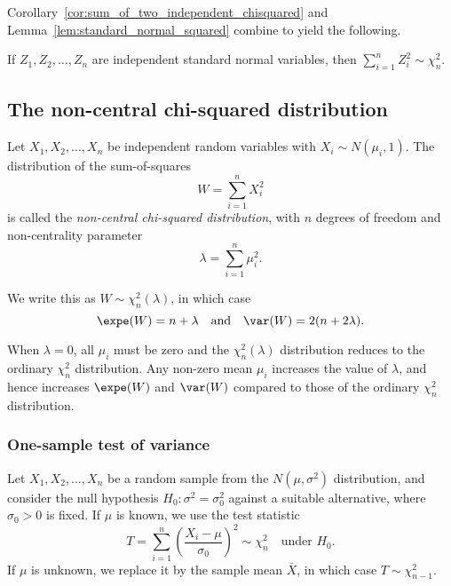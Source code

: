 Corollary~\ref{cor:sum_of_two_independent_chisquared} and Lemma~\ref{lem:standard_normal_squared} combine to yield the following.
\begin{corollary}
If $Z_1,Z_2,\ldots,Z_n$ are independent standard normal variables, then $\displaystyle\sum_{i=1}^n Z_i^2\sim\chi^2_n$.
\end{corollary}

\subsection{The non-central chi-squared distribution}
\begin{definition}
Let $X_1,X_2,\ldots,X_n$ be independent random variables with $X_i\sim N(\mu_i,1)$. The distribution of the sum-of-squares
\[
W=\sum_{i=1}^n X_i^2
\]
is called the \emph{non-central chi-squared distribution}, with $n$ degrees of freedom and non-centrality parameter 
\[
\lambda = \sum_{i=1}^n \mu_i^2.
\]
\end{definition}
We write this as $W\sim\chi^2_n(\lambda)$, in which case
\[
\expe(W)=n+\lambda \quad\text{and}\quad \var(W)=2(n+2\lambda).
\]

When $\lambda=0$, all $\mu_i$ must be zero and the $\chi^2_n(\lambda)$ distribution reduces to the ordinary $\chi^2_n$ distribution. Any non-zero mean $\mu_i$ increases the value of $\lambda$, and hence increases $\expe(W)$ and $\var(W)$ compared to those of the ordinary $\chi^2_n$ distribution. 

\subsubsection{One-sample test of variance}
Let $X_1,X_2,\ldots,X_n$ be a random sample from the $N(\mu,\sigma^2)$ distribution, and consider the null hypothesis $H_0:\sigma^2=\sigma_0^2$ against a suitable alternative, where $\sigma_0>0$ is fixed. If $\mu$ is known, we use the test statistic
\[
T = \sum_{i=1}^n \left(\frac{X_i-\mu}{\sigma_0}\right)^2 \sim \chi^2_n \quad\text{under $H_0$.}
\]
If $\mu$ is unknown, we replace it by the sample mean $\bar{X}$, in which case $T\sim\chi^2_{n-1}$.


